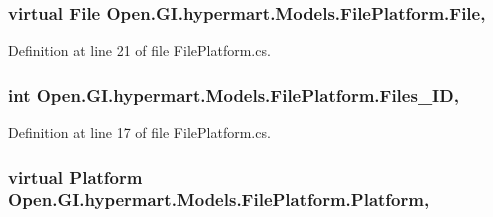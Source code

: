 \subsubsection[{File}]{\setlength{\rightskip}{0pt plus 5cm}virtual {\bf File} Open.\+G\+I.\+hypermart.\+Models.\+File\+Platform.\+File\hspace{0.3cm}{\ttfamily [get]}, {\ttfamily [set]}}\label{class_open_1_1_g_i_1_1hypermart_1_1_models_1_1_file_platform_aa9fd91411ba71f8dd77bdba062daecd3}


Definition at line 21 of file File\+Platform.\+cs.

\hypertarget{class_open_1_1_g_i_1_1hypermart_1_1_models_1_1_file_platform_a6a2b6dbace772016d649b3feb7c65e44}{}
\subsubsection[{Files\+\_\+\+I\+D}]{\setlength{\rightskip}{0pt plus 5cm}int Open.\+G\+I.\+hypermart.\+Models.\+File\+Platform.\+Files\+\_\+\+I\+D\hspace{0.3cm}{\ttfamily [get]}, {\ttfamily [set]}}\label{class_open_1_1_g_i_1_1hypermart_1_1_models_1_1_file_platform_a6a2b6dbace772016d649b3feb7c65e44}


Definition at line 17 of file File\+Platform.\+cs.

\hypertarget{class_open_1_1_g_i_1_1hypermart_1_1_models_1_1_file_platform_aeab28cbe72f89ee18f61510d8ea2b7bc}{}
\subsubsection[{Platform}]{\setlength{\rightskip}{0pt plus 5cm}virtual {\bf Platform} Open.\+G\+I.\+hypermart.\+Models.\+File\+Platform.\+Platform\hspace{0.3cm}{\ttfamily [get]}, {\ttfamily [set]}}\label{class_open_1_1_g_i_1_1hypermart_1_1_models_1_1_file_platform_aeab28cbe72f89ee18f61510d8ea2b7bc}


